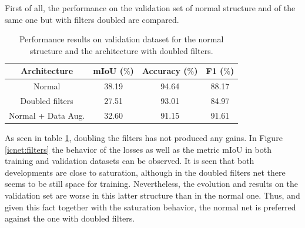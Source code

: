 \documentclass[12pt,a4paper]{article}
\begin{document}
First of all, the performance on the validation set  of normal structure and  of the same one but with filters doubled are compared.

\begin{table}[h!]
  \begin{center}
    
    \begin{tabular}{|c|c|c|c|} %
      \textbf{Architecture} & \textbf{mIoU ($\%$)} & \textbf{Accuracy ($\%$)} & \textbf{F1 ($\%$)} \\
      \hline
      Normal & 38.19 & 94.64 & 88.17\\
      \hline
      Doubled filters & 27.51 & 93.01 & 84.97\\  
      \hline
      Normal + Data Aug. & 32.60 & 91.15 & 91.61\\
    \end{tabular}
    \caption{Performance results on validation dataset for the normal structure and the architecture with doubled filters.}
    \label{icnet:table1}
  \end{center}
\end{table}

As seen in table \ref{icnet:table1}, doubling the filters has not produced any gains. In Figure \ref{icnet:filters} the behavior of the losses as well as the metric mIoU in both training and validation datasets can be observed.  It is seen that both developments are close to saturation, although in the doubled filters net there seems to be still space for training. Nevertheless, the evolution and results on the validation set are worse in this latter structure than in the normal one. Thus, and given this fact together with the saturation behavior, the normal net is preferred against the one with doubled filters.\newline
\end{document}
